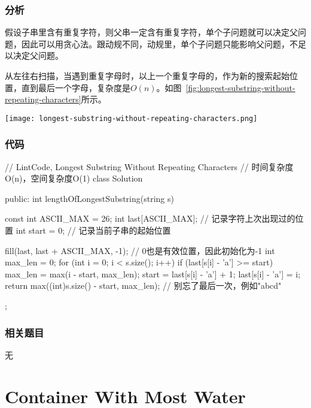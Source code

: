 \subsubsection{分析}
假设子串里含有重复字符，则父串一定含有重复字符，单个子问题就可以决定父问题，因此可以用贪心法。跟动规不同，动规里，单个子问题只能影响父问题，不足以决定父问题。

从左往右扫描，当遇到重复字母时，以上一个重复字母的，作为新的搜索起始位置，直到最后一个字母，复杂度是$O(n)$。如图~\ref{fig:longest-substring-without-repeating-characters}所示。

\begin{center}
\texttt{[image: longest-substring-without-repeating-characters.png]}\\
\label{fig:longest-substring-without-repeating-characters}
\end{center}


\subsubsection{代码}
\begin{Code}
// LintCode, Longest Substring Without Repeating Characters
// 时间复杂度O(n)，空间复杂度O(1)
class Solution {
public:
    int lengthOfLongestSubstring(string s) {
        const int ASCII_MAX = 26;
        int last[ASCII_MAX]; // 记录字符上次出现过的位置
        int start = 0; // 记录当前子串的起始位置

        fill(last, last + ASCII_MAX, -1); // 0也是有效位置，因此初始化为-1
        int max_len = 0;
        for (int i = 0; i < s.size(); i++) {
            if (last[s[i] - 'a'] >= start) {
                max_len = max(i - start, max_len);
                start = last[s[i] - 'a'] + 1;
            }
            last[s[i] - 'a'] = i;
        }
        return max((int)s.size() - start, max_len);  // 别忘了最后一次，例如"abcd"
    }
};
\end{Code}


\subsubsection{相关题目}
\begindot
\item 无
\myenddot


\section{Container With Most Water}
\label{sec:container-with-most-water}


